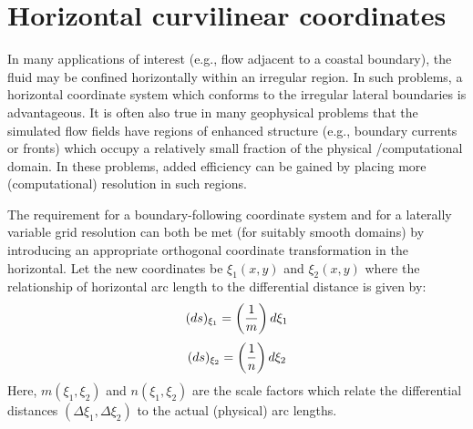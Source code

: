 

\section{Horizontal curvilinear coordinates}
In many applications of interest (e.g., flow adjacent to a coastal
boundary), the fluid may be confined horizontally within an
irregular region.  In such problems, a horizontal coordinate system
which conforms to the irregular lateral boundaries is advantageous.
It is often also true in many geophysical problems that the
simulated flow fields have regions of enhanced structure (e.g.,
boundary currents or fronts) which occupy a relatively small
fraction of the physical /computational domain.  In these problems,
added efficiency can be gained by placing more (computational)
resolution in such regions.

The requirement for a boundary-following coordinate system and for a
laterally variable grid resolution can both be met (for suitably
smooth domains) by introducing an appropriate orthogonal coordinate
transformation in the horizontal.  Let the new coordinates be $\xi_1
(x,y)$ and $\xi_2(x,y)$ where the relationship of horizontal arc
length to the differential distance is given by:
\begin{equation}
   (ds)_{\xi_1} = \left( {1 \over m} \right) d \xi_1
\end{equation}
\begin{equation}
   (ds)_{\xi_2} = \left( {1 \over n} \right) d \xi_2
\end{equation}
Here, $m(\xi_1,\xi_2)$ and $n(\xi_1,\xi_2)$ are the scale factors which
relate the differential distances $(\Delta \xi_1,\Delta \xi_2)$ to the
actual (physical) arc lengths.

